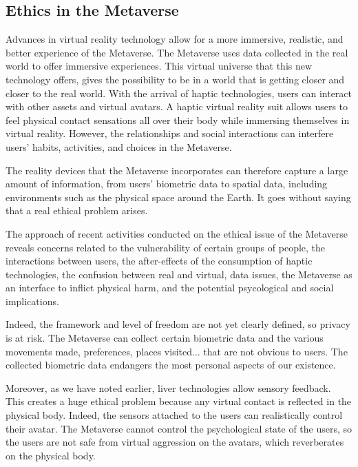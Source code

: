 \documentclass[12pt, a4paper]{article}
\begin{document}
\begin{multicols}{2}
\subsection{Ethics in the Metaverse}

\par Advances in virtual reality technology allow for a more immersive, realistic, and better experience of the Metaverse. The Metaverse uses data collected in the real world to offer immersive experiences. This virtual universe that this new technology offers, gives the possibility to be in a world that is getting closer and closer to the real world. With the arrival of haptic technologies, users can interact with other assets and virtual avatars. A haptic virtual reality suit allows users to feel physical contact sensations all over their body while immersing themselves in virtual reality. However, the relationships and social interactions can interfere users' habits, activities, and choices in the Metaverse\cite{ethics}.
\par The reality devices that the Metaverse incorporates can therefore capture a large amount of information, from users' biometric data to spatial data, including environments such as the physical space around the Earth. It goes without saying that a real ethical problem arises\cite{ethics}.
\par The approach of recent activities conducted on the ethical issue of the Metaverse reveals concerns related to the vulnerability of certain groups of people, the interactions between users, the after-effects of the consumption of haptic technologies, the confusion between real and virtual, data issues, the Metaverse as an interface to inflict physical harm, and the potential psycological and social implications\cite{ethics}.
\par Indeed, the framework and level of freedom are not yet clearly defined, so privacy is at risk. The Metaverse can collect certain biometric data and the various movements made, preferences, places visited... that are not obvious to users. The collected biometric data endangers the most personal aspects of our existence\cite{ethics}.
\par Moreover, as we have noted earlier, liver technologies allow sensory feedback. This creates a huge ethical problem because any virtual contact is reflected in the physical body. Indeed, the sensors attached to the users can realistically control their avatar. The Metaverse cannot control the psychological state of the users, so the users are not safe from virtual aggression on the avatars, which reverberates on the physical body\cite{ethics}.

\end{multicols}
\end{document}
